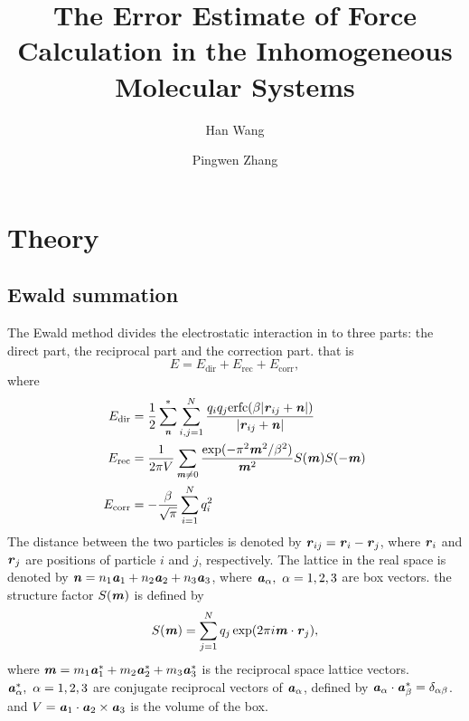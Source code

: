 \documentclass[aps,pre,preprint]{revtex4-1}
\renewcommand{\v}[1]{\textbf{\textit{#1}}}
\begin{document}
\title{The Error Estimate of Force Calculation in the Inhomogeneous Molecular Systems}
\author{Han Wang}
\author{Pingwen Zhang}

\begin{abstract}
\end{abstract}

\maketitle

\section{Theory}
\subsection{Ewald summation}
The Ewald method divides the electrostatic interaction in to three
parts: the direct part, the reciprocal part and the correction
part. that is
\begin{equation}
E = E_{\textrm{dir}} + E_{\textrm{rec}} + E_{\textrm{corr}},
\end{equation}
where 
\begin {align}
E_{\textrm{dir}} & = \frac12 \sum^{\ast}_{\v n}
\sum_{i,j = 1}^{N} \frac{q_iq_j \textrm{erfc}(\beta \vert\v{r}_{ij} + \v{n}\vert)}
{\vert\v{r}_{ij} + \v{n}\vert} \\
E_{\textrm{rec}} & = \frac1{2\pi V} \sum_{\v m \neq 0}
\frac{\exp(-\pi^2\v m^2 / \beta^2)}{\v m^2} S(\v m) S(-\v m) \\
 E_{\textrm{corr}}& = -\frac\beta{\sqrt \pi} \sum_{i=1}^N q_i^2
\end {align}
The distance between the two particles is denoted by $\v r_{ij} = \v
r_i - \v r_j$, where $\v r_i$ and $\v r_j$ are positions of particle
$i$ and $j$, respectively.  The lattice in the real space is denoted
by $\v n = n_1 \v a_1 + n_2 \v a_2 + n_3 \v a_3$, where $\v a_\alpha,
\ \alpha=1,2,3$ are box vectors. the structure factor $S(\v m)$ is
defined by
\begin{equation}\label{sm1}
S(\v m) = \sum_{j=1}^N q_j \exp (2 \pi i \v m \cdot \v r_j),
\end{equation}
where $\v m = m_1 \v a_1^\ast + m_2 \v a_2^\ast + m_3 \v a_3^\ast$ is
the reciprocal space lattice vectors. $\v a_\alpha^\ast,\ \alpha = 1,
2, 3$ are conjugate reciprocal vectors of $\v a_\alpha$, defined by
$\v a_\alpha \cdot \v a_\beta^\ast = \delta_{\alpha\beta}$. and $V =
\v a_1 \cdot \v a_2 \times \v a_3$ is the volume of the box.
\end{document}
